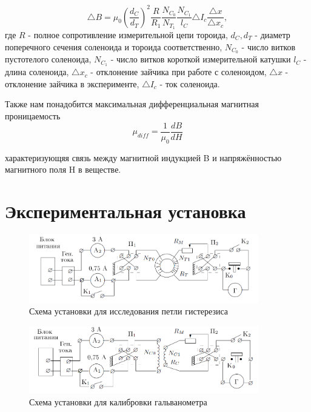 \documentclass[a4paper, 12pt]{article}
\begin{document}
\begin{equation}
    \triangle B = \mu_0 (\frac{d_C}{d_T})^2 \frac{R}{R_1} \frac{N_C_0}{N_T_1} \frac{N_C_1}{l_C} \triangle I_{c} \frac{\triangle x}{\triangle x_{c}},
\end{equation}
где $R$ - полное сопротивление измерительной цепи тороида, $d_C, d_T$ - диаметр поперечного сечения соленоида и тороида соответственно, $N_C_0$  - число витков пустотелого соленоида, $N_C_1$ - число витков короткой измерительной катушки $l_C$ - длина соленоида, $\triangle x_c$ - отклонение зайчика при работе с соленоидом, $\triangle x$ - отклонение зайчика в эксперименте, $\triangle I_{c}$ - ток соленоида.

Также нам понадобится максимальная дифференциальная магнитная проницаемость 
\begin{equation}
    \mu_{diff} = \frac{1}{\mu_0}\frac{dB}{dH}
\end{equation}

характеризующяя связь между магнитной индукцией B и напряжённостью магнитного поля H в веществе.

\newpage

\section*{Экспериментальная установка}

\begin{figure}[H]
    \centering
    \includegraphics[width=10cm]{fig2.PNG}
    \caption{Схема установки для исследования петли гистерезиса}
    \label{fig:vac}
\end{figure}

\begin{figure}[H]
    \centering
    \includegraphics[width=10cm]{fig3.PNG}
    \caption{Схема установки для калибровки гальванометра}
    \label{fig:vac}
\end{figure}
\end{document}
